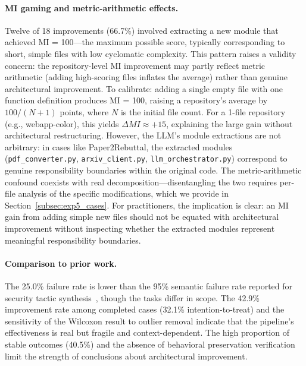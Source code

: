 \documentclass[sigconf,review,anonymous]{acmart}
\begin{document}
\paragraph{MI gaming and metric-arithmetic effects.} Twelve of 18 improvements (66.7\%) involved extracting a new module that achieved MI = 100---the maximum possible score, typically corresponding to short, simple files with low cyclomatic complexity. This pattern raises a validity concern: the repository-level MI improvement may partly reflect metric arithmetic (adding high-scoring files inflates the average) rather than genuine architectural improvement. To calibrate: adding a single empty file with one function definition produces MI = 100, raising a repository's average by $100 / (N+1)$ points, where $N$ is the initial file count. For a 1-file repository (e.g., webapp-color), this yields $\Delta MI \approx +15$, explaining the large gain without architectural restructuring. However, the LLM's module extractions are not arbitrary: in cases like Paper2Rebuttal, the extracted modules (\texttt{pdf\_converter.py}, \texttt{arxiv\_client.py}, \texttt{llm\_orchestrator.py}) correspond to genuine responsibility boundaries within the original code. The metric-arithmetic confound coexists with real decomposition---disentangling the two requires per-file analysis of the specific modifications, which we provide in Section~\ref{subsec:exp5_cases}. For practitioners, the implication is clear: an MI gain from adding simple new files should not be equated with architectural improvement without inspecting whether the extracted modules represent meaningful responsibility boundaries.

\paragraph{Comparison to prior work.} The 25.0\% failure rate is lower than the 95\% semantic failure rate reported for security tactic synthesis~\cite{shokri2024ipsynth}, though the tasks differ in scope. The 42.9\% improvement rate among completed cases (32.1\% intention-to-treat) and the sensitivity of the Wilcoxon result to outlier removal indicate that the pipeline's effectiveness is real but fragile and context-dependent. The high proportion of stable outcomes (40.5\%) and the absence of behavioral preservation verification limit the strength of conclusions about architectural improvement.
\end{document}
